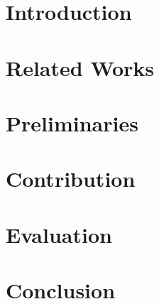 \documentclass{llncs2e/llncs}
\begin{document}
\def\todo#1{{\color{red}TODO:\quad#1}}

\section{Introduction}


\section{Related Works}


\section{Preliminaries}


\section{Contribution}


\section{Evaluation}


\section{Conclusion}


%
%
\newpage
\nocite{*}


\end{document}
